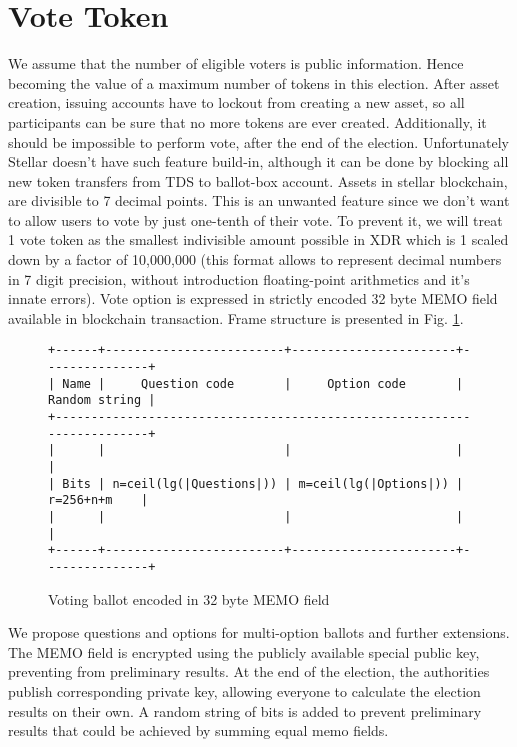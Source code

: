 \documentclass[runningheads]{llncs}
\begin{document}
\section{Vote Token}
We assume that the number of eligible voters is public information. Hence becoming the value of a maximum number of tokens in this election. After asset creation, issuing accounts have to lockout from creating a new asset, so all participants can be sure that no more tokens are ever created. Additionally, it should be impossible to perform vote, after the end of the election. Unfortunately Stellar doesn’t have such feature build-in, although it can be done by blocking all new token transfers from TDS to ballot-box account.
Assets in stellar blockchain, are divisible to 7 decimal points. This is an unwanted feature since we don’t want to allow users to vote by just one-tenth of their vote. To prevent it, we will treat 1 vote token as the smallest indivisible amount possible in XDR which is 1 scaled down by a factor of 10,000,000 (this format allows to represent decimal numbers in 7 digit precision, without introduction floating-point arithmetics and it’s innate errors).
Vote option is expressed in strictly encoded 32 byte MEMO field available in blockchain transaction. Frame structure is presented in Fig. \ref{fig:ballot-encoding}. 
\begin{figure}
\begin{verbatim}
+------+-------------------------+-----------------------+---------------+
| Name |     Question code       |     Option code       | Random string |
+------------------------------------------------------------------------+
|      |                         |                       |               |
| Bits | n=ceil(lg(|Questions|)) | m=ceil(lg(|Options|)) |  r=256+n+m    |
|      |                         |                       |               |
+------+-------------------------+-----------------------+---------------+

\end{verbatim}
\caption{Voting ballot encoded in 32 byte MEMO field}
\label{fig:ballot-encoding}
\end{figure} 

We propose questions and options for multi-option ballots and further extensions.
The MEMO field is encrypted using the publicly available special public key, preventing from preliminary results. At the end of the election, the authorities publish corresponding private key, allowing everyone to calculate the election results on their own. A random string of bits is added to prevent preliminary results that could be achieved by summing equal memo fields.
\end{document}

